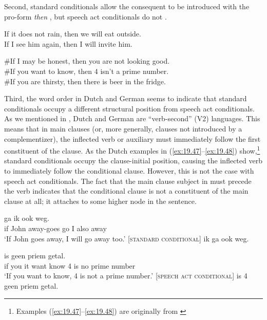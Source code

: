 Second, standard conditionals allow the consequent to be introduced with the pro-form \textit{then} , but speech act conditionals do not .


\ea \label{ex:19.45}
\ea  If it does not rain, then we will eat outside.\\
\ex If I see him again, then I will invite him.
                       \z
\z

\ea \label{ex:19.46}
\ea \#If I may be honest, then you are not looking good.\\
\ex \#If you want to know, then 4 isn’t a prime number.\\
\ex \#If you are thirsty, then there is beer in the fridge.
                       \z
\z


Third, the word order in Dutch and German seems to indicate that standard conditionals occupy a different structural position from speech act conditionals. As we mentioned in , Dutch and German are “verb-second” (V2) languages. This means that in main clauses (or, more generally, clauses not introduced by a complementizer), the inflected verb or auxiliary must immediately follow the first constituent of the clause. As the Dutch examples in (\ref{ex:19.47}--\ref{ex:19.48}) show,\footnote{Examples (\ref{ex:19.47}--\ref{ex:19.48}) are originally from \citet[ch. 2]{Iatridou1991}} standard conditionals occupy the clause-initial position, causing the inflected verb to immediately follow the conditional clause. However, this is not the case with speech act conditionals. The fact that the main clause subject in  must precede the verb indicates that the conditional clause is not a constituent of the main clause at all; it attaches to some higher node in the sentence.


\ea \label{ex:19.47}
\ea  {}  ga  ik  ook  weg.\\
 if  John  away-goes  go  I  also  away\\
\glt ‘If John goes away, I will go away too.’    [\textsc{standard conditional}]
 ik ga ook weg.
\z \z

\ea \label{ex:19.48}
\ea  {}  is  geen  priem  getal.\\
 if  you  it  want  know  4  is  no  prime  number\\
\glt ‘If you want to know, 4 is not a prime number.’  [\textsc{speech act} \textsc{conditional}]
 is 4 geen priem getal.
\z \z


